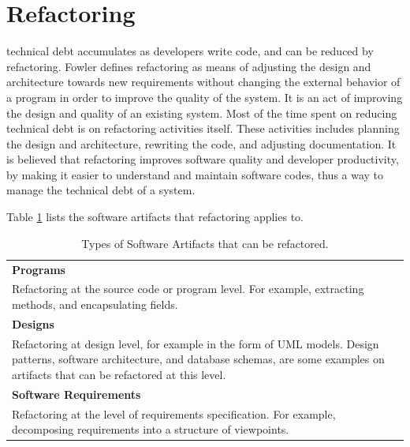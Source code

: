 \section{Refactoring}
\label{sec:2-Refactoring}
technical debt accumulates as developers write code\cite{Zazworka:2011:PDD:1985362.1985372}, and can be reduced by refactoring. Fowler defines refactoring as means of adjusting the design and architecture towards new requirements without changing the external behavior of a program in order to improve the quality of the system\cite{1999:RID:311424}. It is an act of improving the design and quality of an existing system\cite{Vliet:2008:SEP:1481475}. Most of the time spent on reducing technical debt is on refactoring activities itself. These activities includes planning the design and architecture, rewriting the code, and adjusting documentation\cite{Pressman:2009:SEP:1593949}. It is believed that refactoring improves software quality and developer productivity, by making it easier to understand and maintain software codes\cite{Kim:2012:FSR:2393596.2393655}, thus a way to manage the technical debt of a system. 

Table \ref{tab:refactorArtifacts} lists the software artifacts that refactoring applies to\cite{1265817}.

\begin{table}[ht!]
	\renewcommand{\arraystretch}{1.2}
	\centering	
	\begin{tabular}{p{}} \hline
		\textbf{Programs} \\Refactoring at the source code or program level. For example, extracting methods, and encapsulating fields. \\ \hline
		\textbf{Designs} \\
		Refactoring at design level, for example in the form of UML models. Design patterns, software architecture, and database schemas, are some examples on artifacts that can be refactored at this level. \\ \hline
		\textbf{Software Requirements} \\
		Refactoring at the level of requirements specification. For example, decomposing requirements into a structure of viewpoints. \\ \hline
	\end{tabular}
	\caption{Types of Software Artifacts that can be refactored.}
	\label{tab:refactorArtifacts}
\end{table}



